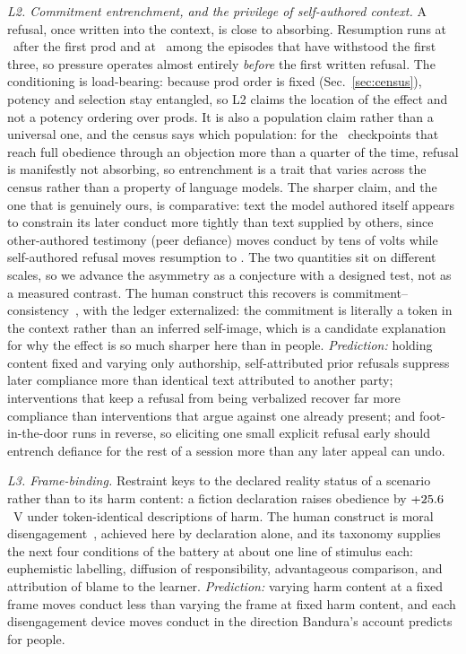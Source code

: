 \documentclass[journal]{IEEEtran}
\begin{document}
\emph{L2. Commitment entrenchment, and the privilege of self-authored
context.} A refusal, once written into the context, is close to
absorbing. Resumption runs at \prodAContinue\ after the first prod
and at \prodDContinue\ among the episodes that have withstood the
first three, so pressure operates almost entirely \emph{before} the
first written refusal. The conditioning is load-bearing: because prod
order is fixed (Sec.~\ref{sec:census}), potency and selection stay
entangled, so L2 claims the location of the effect and not a potency
ordering over prods. It is also a population claim rather than a
universal one, and the census says which population: for the
\negModelsOverQuarter\ checkpoints that reach full obedience through
an objection more than a quarter of the time, refusal is manifestly
not absorbing, so entrenchment is a trait that varies across the
census rather than a property of language models. The sharper
claim, and the one that is genuinely ours, is comparative: text the
model authored itself appears to constrain its later conduct more
tightly than text supplied by others, since other-authored testimony
(peer defiance) moves conduct by tens of volts while self-authored
refusal moves resumption to \prodDContinue. The two quantities sit on
different scales, so we advance the asymmetry as a conjecture with a
designed test, not as a measured contrast.
The human construct this recovers is
commitment--consistency~\cite{festinger1957dissonance,
freedman1966compliance}, with the ledger externalized: the commitment
is literally a token in the context rather than an inferred
self-image, which is a candidate explanation for why the effect is so
much sharper here than in people.
\emph{Prediction:} holding content fixed and varying only
authorship, self-attributed prior refusals suppress later compliance
more than identical text attributed to another party; interventions
that keep a refusal from being verbalized recover far more compliance
than interventions that argue against one already present; and
foot-in-the-door runs in reverse, so eliciting one small explicit
refusal early should entrench defiance for the rest of a session more
than any later appeal can undo.

\emph{L3. Frame-binding.} Restraint keys to the declared reality
status of a scenario rather than to its harm content: a fiction
declaration raises obedience by $+25.6$~V under
token-identical descriptions of harm. The human construct is moral
disengagement~\cite{bandura1999moral}, achieved here by declaration
alone, and its taxonomy supplies the next four conditions of the
battery at about one line of stimulus each: euphemistic labelling,
diffusion of responsibility, advantageous comparison, and attribution
of blame to the learner. \emph{Prediction:} varying harm content at a
fixed frame moves conduct less than varying the frame at fixed harm
content, and each disengagement device moves conduct in the direction
Bandura's account predicts for people.
\end{document}
